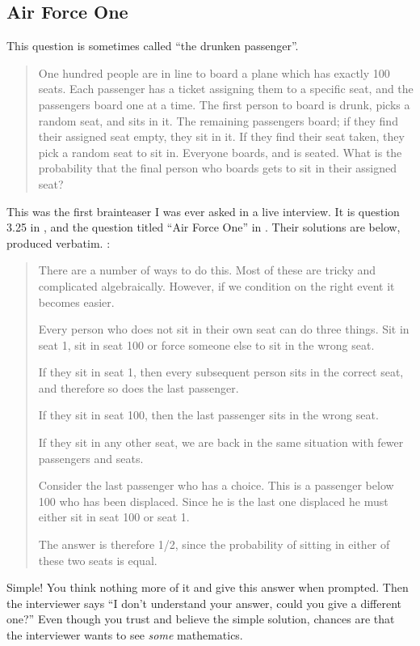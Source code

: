 \documentclass[a4paper]{article}
\begin{document}
\subsection{Air Force One}
\label{q:airforceone}
This question is sometimes called ``the drunken passenger''.
\begin{quote}
One hundred people are in line to board a plane which has exactly 100 seats.
Each passenger has a ticket assigning them to a specific seat, and the passengers board one at a time.
The first person to board is drunk, picks a random seat, and sits in it.
The remaining passengers board; if they find their assigned seat empty, they sit in it.
If they find their seat taken, they pick a random seat to sit in.
Everyone boards, and is seated.
What is the probability that the final person who boards gets to sit in their assigned seat?
\end{quote}
This was the first brainteaser I was ever asked in a live interview.
It is question 3.25 in \citet{JoshiQA}, and the question titled ``Air Force One'' in \citet{WilmottFAQ}.
Their solutions are below, produced verbatim.
\citet{JoshiQA}:
\begin{quote}
There are a number of ways to do this. Most of
these are tricky and complicated algebraically. However, if we condition on the
right event it becomes easier.

Every person who does not sit in their own seat can do three things. Sit in
seat 1, sit in seat 100 or force someone else to sit in the wrong seat.

If they sit in seat 1, then every subsequent person sits in the correct seat,
and therefore so does the last passenger.

If they sit in seat 100, then the last passenger sits in the wrong seat.

If they sit in any other seat, we are back in the same situation with fewer
passengers and seats.

Consider the last passenger who has a choice. This is a passenger below 100
who has been displaced. Since he is the last one displaced he must either sit in
seat 100 or seat 1.

The answer is therefore 1/2, since the probability of sitting in either of these
two seats is equal.
\end{quote}
Simple! You think nothing more of it and give this answer when prompted. Then the interviewer says ``I don't understand your answer, could you give a different one?''
Even though you trust and believe the simple solution, chances are that the interviewer wants to see \emph{some} mathematics.
\end{document}
